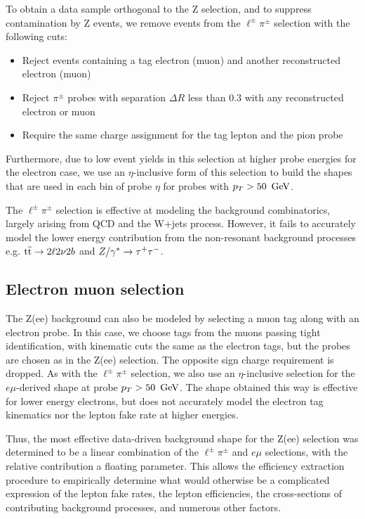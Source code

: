 To obtain a data sample orthogonal to the Z selection, and to suppress contamination by Z events,
we remove events from the \ensuremath{\ell^{\pm}\pi^{\pm}} selection with the following cuts:
\begin{itemize}
\item Reject events containing a tag electron (muon) and another reconstructed electron (muon)
\item Reject \ensuremath{\pi^{\pm}} probes with separation $\Delta R$ less than 0.3 with any reconstructed electron or muon
\item Require the same charge assignment for the tag lepton and the pion probe
\end{itemize}

Furthermore, due to low event yields in this selection at higher probe energies for the electron case,
we use an $\eta$-inclusive form of this selection to build the shapes that are used in each bin of probe $\eta$ for probes with $p_{T} > 50~\,\text{Ge\hspace{-.08em}V}$.

The \ensuremath{\ell^{\pm}\pi^{\pm}} selection is effective at modeling the background combinatorics, largely
arising from QCD and the W+jets process. However, it fails to accurately
model the lower energy contribution from the non-resonant background processes e.g. ${\mathrm{t}\overline{\mathrm{t}}} \to 2\ell 2\nu 2b$ and $Z/\gamma^*\to\tau^+\tau^-$.
\subsection{Electron muon selection}
The Z(ee) background can also be modeled by selecting a muon tag along with an electron probe.
In this case, we choose tags from the muons passing tight identification, with kinematic cuts the same as the electron tags,
but the probes are chosen as in the Z(ee) selection. The opposite sign charge requirement is dropped. 
As with the \ensuremath{\ell^{\pm}\pi^{\pm}} selection, we also use an $\eta$-inclusive selection for the \ensuremath{e\mu}-derived shape at probe $p_{T} > 50~\,\text{Ge\hspace{-.08em}V}$.
The shape obtained this way is effective for lower energy electrons, but does not accurately model the electron tag kinematics nor the lepton fake rate at higher energies.

Thus, the most effective data-driven background shape for the Z(ee) selection was determined to be a linear combination of
the \ensuremath{\ell^{\pm}\pi^{\pm}} and \ensuremath{e\mu} selections, with the relative contribution a floating parameter.
This allows the efficiency extraction procedure to empirically determine what would otherwise be a
complicated expression of the lepton fake rates, the lepton efficiencies, 
the cross-sections of contributing background processes, and numerous other factors.

